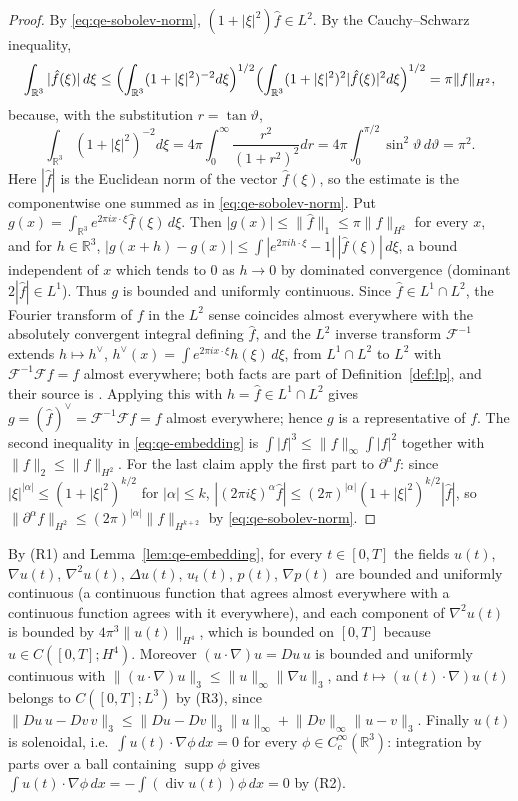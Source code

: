 \documentclass[11pt]{article}
\theoremstyle{definition}
\theoremstyle{plain}
\newcommand{\R}{\mathbb R}
\newcommand{\norm}[1]{\lVert #1\rVert}
\begin{document}
\begin{proof}
By \eqref{eq:qe-sobolev-norm}, $(1+|\xi|^2)\hat f\in L^2$.  By the
Cauchy--Schwarz inequality,
\[
 \int_{\R^3}|\hat f(\xi)|\,d\xi
 \le\Bigl(\int_{\R^3}(1+|\xi|^2)^{-2}d\xi\Bigr)^{1/2}
 \Bigl(\int_{\R^3}(1+|\xi|^2)^{2}|\hat f(\xi)|^2d\xi\Bigr)^{1/2}
 =\pi\norm f_{H^2},
\]
because, with the substitution $r=\tan\vartheta$,
\[
 \int_{\R^3}(1+|\xi|^2)^{-2}d\xi
 =4\pi\int_0^\infty\frac{r^2}{(1+r^2)^{2}}dr
 =4\pi\int_0^{\pi/2}\sin^2\vartheta\,d\vartheta=\pi^2 .
\]
Here $|\hat f|$ is the Euclidean norm of the vector $\hat f(\xi)$, so
the estimate is the componentwise one summed as in
\eqref{eq:qe-sobolev-norm}.
Put $g(x)=\int_{\R^3}e^{2\pi ix\cdot\xi}\hat f(\xi)\,d\xi$.  Then
$|g(x)|\le\norm{\hat f}_1\le\pi\norm f_{H^2}$ for every $x$, and for
$h\in\R^3$,
$|g(x+h)-g(x)|\le\int|e^{2\pi ih\cdot\xi}-1|\,|\hat f(\xi)|\,d\xi$, a bound
independent of $x$ which tends to $0$ as $h\to0$ by dominated convergence
(dominant $2|\hat f|\in L^1$).  Thus $g$ is bounded and uniformly
continuous.  Since $\hat f\in L^1\cap L^2$, the Fourier transform of $f$ in
the $L^2$ sense coincides almost everywhere with the absolutely convergent
integral defining $\hat f$, and the $L^2$ inverse transform
$\mathcal F^{-1}$ extends $h\mapsto h^\vee$,
$h^\vee(x)=\int e^{2\pi ix\cdot\xi}h(\xi)\,d\xi$, from $L^1\cap L^2$ to
$L^2$ with $\mathcal F^{-1}\mathcal Ff=f$ almost everywhere; both facts are
part of Definition~\ref{def:lp}, and their source is
\cite[\S2.2.4, pp.~113--114]{Grafakos2014}.  Applying this with
$h=\hat f\in L^1\cap L^2$ gives $g=(\hat f)^\vee=\mathcal F^{-1}\mathcal Ff=f$
almost everywhere; hence $g$ is a representative of $f$.  The second
inequality in \eqref{eq:qe-embedding} is
$\int|f|^3\le\norm f_\infty\int|f|^2$ together with
$\norm f_2\le\norm f_{H^2}$.  For the last claim apply the first part to
$\partial^\alpha f$: since $|\xi|^{|\alpha|}\le(1+|\xi|^2)^{k/2}$ for
$|\alpha|\le k$,
$|(2\pi i\xi)^\alpha\hat f|\le(2\pi)^{|\alpha|}(1+|\xi|^2)^{k/2}|\hat f|$,
so $\norm{\partial^\alpha f}_{H^2}\le(2\pi)^{|\alpha|}\norm f_{H^{k+2}}$
by \eqref{eq:qe-sobolev-norm}.
\end{proof}

By (R1) and Lemma~\ref{lem:qe-embedding}, for every $t\in[0,T]$ the fields
$u(t)$, $\nabla u(t)$, $\nabla^2u(t)$, $\Delta u(t)$, $u_t(t)$, $p(t)$,
$\nabla p(t)$ are bounded and uniformly continuous (a continuous function
that agrees almost everywhere with a continuous function agrees with it
everywhere), and each component of $\nabla^2u(t)$ is bounded by
$4\pi^3\norm{u(t)}_{H^4}$, which is bounded on $[0,T]$ because
$u\in C([0,T];H^4)$.  Moreover $(u\cdot\nabla)u=Du\,u$ is bounded and
uniformly continuous with
$\norm{(u\cdot\nabla)u}_3\le\norm u_\infty\norm{\nabla u}_3$, and
$t\mapsto(u(t)\cdot\nabla)u(t)$ belongs to $C([0,T];L^3)$ by (R3), since
$\norm{Du\,u-Dv\,v}_3\le\norm{Du-Dv}_3\norm u_\infty+\norm{Dv}_\infty\norm{u-v}_3$.
Finally $u(t)$ is solenoidal, i.e.\ $\int u(t)\cdot\nabla\phi\,dx=0$ for
every $\phi\in C_c^\infty(\R^3)$: integration by parts over a ball containing
$\operatorname{supp}\phi$ gives
$\int u(t)\cdot\nabla\phi\,dx=-\int(\operatorname{div}u(t))\phi\,dx=0$ by
(R2).
\end{document}
